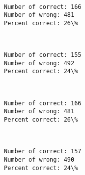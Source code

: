 \documentclass[11pt]{article}
\begin{document}
    \begin{center}
    \end{center}
    { \hspace*{\fill} \\}
    
    \begin{Verbatim}[commandchars=\\\{\}]
Number of correct: 166
Number of wrong: 481
Percent correct: 26\%

    \end{Verbatim}

    \begin{center}
    \end{center}
    { \hspace*{\fill} \\}
    
    \begin{Verbatim}[commandchars=\\\{\}]
Number of correct: 155
Number of wrong: 492
Percent correct: 24\%

    \end{Verbatim}

    \begin{center}
    \end{center}
    { \hspace*{\fill} \\}
    
    \begin{Verbatim}[commandchars=\\\{\}]
Number of correct: 166
Number of wrong: 481
Percent correct: 26\%

    \end{Verbatim}

    \begin{center}
    \end{center}
    { \hspace*{\fill} \\}
    
    \begin{Verbatim}[commandchars=\\\{\}]
Number of correct: 157
Number of wrong: 490
Percent correct: 24\%

    \end{Verbatim}
\end{document}
